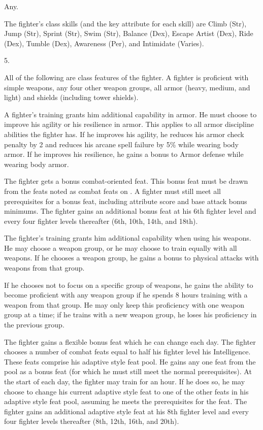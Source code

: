  Any.

The fighter's class skills (and the key attribute for each skill) are Climb (Str), Jump (Str), Sprint (Str), Swim (Str), Balance (Dex), Escape Artist (Dex), Ride (Dex), Tumble (Dex), Awareness (Per), and Intimidate (Varies).

5.

All of the following are class features of the fighter.
 A fighter is proficient with simple weapons, any four other weapon groups,  all armor (heavy, medium, and light) and shields (including tower shields).

A fighter's training grants him additional capability in armor.
He must choose to improve his agility or his resilience in armor.
This applies to all armor discipline abilities the fighter has.
If he improves his agility, he reduces his armor check penalty by 2 and reduces his arcane spell failure by 5\% while wearing body armor.
If he improves his resilience, he gains a  bonus to Armor defense while wearing body armor.

The fighter gets a bonus combat-oriented feat.
This bonus feat must be drawn from the feats noted as combat feats on .
A fighter must still meet all prerequisites for a bonus feat, including attribute score and base attack bonus minimums.
The fighter gains an additional bonus feat at his 6th fighter level and every four fighter levels thereafter (6th, 10th, 14th, and 18th).

The fighter's training grants him additional capability when using his weapons.
He may choose a weapon group, or he may choose to train equally with all weapons.
If he chooses a weapon group, he gains a  bonus to physical attacks with weapons from that group.
\par If he chooses not to focus on a specific group of weapons, he gains the ability to become proficient with any weapon group if he spends 8 hours training with a weapon from that group.
He may only keep this proficiency with one weapon group at a time; if he trains with a new weapon group, he loses his proficiency in the previous group.

The fighter gains a flexible bonus feat which he can change each day.
The fighter chooses a number of combat feats equal to half his fighter level \add his Intelligence.
These feats comprise his adaptive style feat pool.
He gains any one feat from the pool as a bonus feat (for which he must still meet the normal prerequisites).
At the start of each day, the fighter may train for an hour.
If he does so, he may choose to change his current adaptive style feat to one of the other feats in his adaptive style feat pool, assuming he meets the prerequisites for the feat.
The fighter gains an additional adaptive style feat at his 8th fighter level and every four fighter levels thereafter (8th, 12th, 16th, and 20th).

